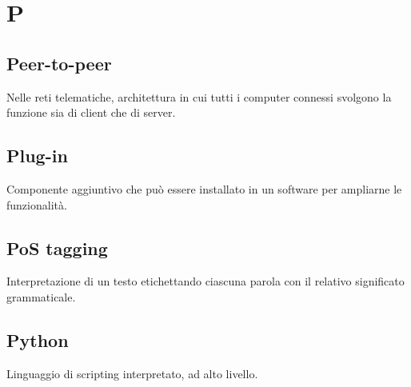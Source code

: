 \section*{P}
\subsection*{Peer-to-peer}
Nelle reti telematiche, architettura in cui tutti i computer connessi svolgono la funzione sia di client che di server.

\subsection*{Plug-in}
Componente aggiuntivo che può essere installato in un software per ampliarne le funzionalità.

\subsection*{PoS tagging}
Interpretazione di un testo etichettando ciascuna parola con il relativo significato grammaticale.

\subsection*{Python}
Linguaggio di scripting interpretato, ad alto livello.


